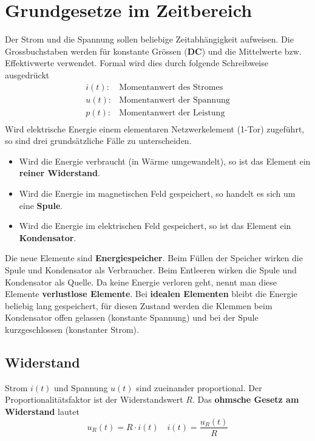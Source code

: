 \section{Grundgesetze im Zeitbereich}
Der Strom und die Spannung sollen beliebige Zeitabhängigkeit aufweisen. Die Grossbuchstaben werden für konstante Grössen (\textbf{DC}) und die Mittelwerte bzw. Effektivwerte verwendet. Formal wird dies durch folgende Schreibweise ausgedrückt
\begin{equation}
\boxed{
\begin{array}{ll}
i\left(t\right):&\text{Momentanwert des Stromes}\\
u\left(t\right):&\text{Momentanwert der Spannung}\\
p\left(t\right):&\text{Momentanwert der Leistung}\\
\end{array}
}
\end{equation}
Wird elektrische Energie einem elementaren Netzwerkelement (1-Tor) zugeführt, so sind drei grundsätzliche Fälle zu unterscheiden.
\begin{itemize}
\item Wird die Energie verbraucht (in Wärme umgewandelt), so ist das Element ein \textbf{reiner Widerstand}.
\item Wird die Energie im magnetischen Feld gespeichert, so handelt es sich um eine \textbf{Spule}.
\item Wird die Energie im elektrischen Feld gespeichert, so ist das Element ein \textbf{Kondensator}.
\end{itemize}
Die neue Elemente sind \textbf{Energiespeicher}. Beim Füllen der Speicher wirken die Spule und Kondensator als Verbraucher. Beim Entleeren wirken die Spule und Kondensator als Quelle. Da keine Energie verloren geht, nennt man diese Elemente \textbf{verlustlose Elemente}.
\newline\newline
Bei \textbf{idealen Elementen} bleibt die Energie beliebig lang gespeichert, für diesen Zustand werden die Klemmen beim Kondensator offen gelassen (konstante Spannung) und bei der Spule kurzgeschlossen (konstanter Strom).
\subsection{Widerstand}
Strom $i\left(t\right)$ und Spannung $u\left(t\right)$ sind zueinander proportional. Der Proportionalitätsfaktor ist der Widerstandswert $R$. Das \textbf{ohmsche Gesetz am Widerstand} lautet
\begin{equation}
\boxed{u_R\left(t\right)=R\cdot i\left(t\right)}\quad \boxed{i\left(t\right)=\dfrac{u_R\left(t\right)}{R}}
\end{equation}

